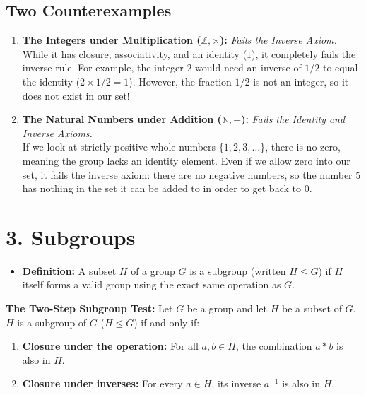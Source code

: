 \documentclass[12pt]{article}
\begin{document}
\subsection*{Two Counterexamples}
\begin{enumerate}
    \item \textbf{The Integers under Multiplication ($\mathbb{Z}, \times$):}
          \textit{Fails the Inverse Axiom.} \\
          While it has closure, associativity, and an identity ($1$), it completely fails the inverse rule. For example, the integer $2$ would need an inverse of $1/2$ to equal the identity ($2 \times 1/2 = 1$). However, the fraction $1/2$ is not an integer, so it does not exist in our set!

    \item \textbf{The Natural Numbers under Addition ($\mathbb{N}, +$):}
          \textit{Fails the Identity and Inverse Axioms.} \\
          If we look at strictly positive whole numbers $\{1, 2, 3, \dots\}$, there is no zero, meaning the group lacks an identity element. Even if we allow zero into our set, it fails the inverse axiom: there are no negative numbers, so the number $5$ has nothing in the set it can be added to in order to get back to $0$.
\end{enumerate}

\section*{3. Subgroups}

\begin{itemize}
    \item \textbf{Definition:} A subset $H$ of a group $G$ is a subgroup (written $H \leq G$) if $H$ itself forms a valid group using the exact same operation as $G$.
\end{itemize}

\textbf{The Two-Step Subgroup Test:} Let $G$ be a group and let $H$ be a subset of $G$. $H$ is a subgroup of $G$ ($H \leq G$) if and only if:
\begin{enumerate}
    \item[1.] \textbf{Closure under the operation:} For all $a, b \in H$, the combination $a * b$ is also in $H$.
    \item[2.] \textbf{Closure under inverses:} For every $a \in H$, its inverse $a^{-1}$ is also in $H$.
\end{enumerate}
\end{document}
